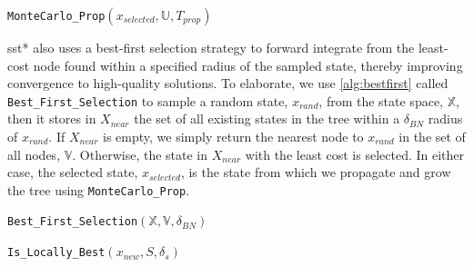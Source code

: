 \begin{algorithm}
\caption{\texttt{MonteCarlo\_Prop}$(x_{selected}, \mathbb{U}, T_{prop})$}
\label{alg:montecarlo}
\begin{algorithmic}[1]
\end{algorithmic}{}
\end{algorithm}


\gls{sst}* also uses a best-first selection strategy to forward integrate from the least-cost node found within a specified radius of the sampled state, thereby improving convergence to high-quality solutions. To elaborate, we use \autoref{alg:bestfirst} called \texttt{Best\_First\_Selection} to sample a random state, $x_{rand}$, from the state space, $\mathbb{X}$, then it stores in $X_{near}$ the set of all existing states in the tree within a $\delta_{BN}$ radius of $x_{rand}$. If $X_{near}$ is empty, we simply return the nearest node to $x_{rand}$ in the set of all nodes, $\mathbb{V}$. Otherwise, the state in $X_{near}$ with the least cost is selected. In either case, the selected state, $x_{selected}$, is the state from which we propagate and grow the tree using \texttt{MonteCarlo\_Prop}.

\begin{algorithm}
\caption{\texttt{Best\_First\_Selection}$(\mathbb{X}, \mathbb{V}, \delta_{BN})$}
\label{alg:bestfirst}
\begin{algorithmic}[1]
    \Else{}
    \EndIf{}
\end{algorithmic}{}
\end{algorithm}

\begin{algorithm}
\caption{\texttt{Is\_Locally\_Best}$(x_{new}, S, \delta_s)$}
\label{alg:locallybest}
\begin{algorithmic}[1]
    \EndIf{}
    \EndIf{}
\end{algorithmic}{}
\end{algorithm}

